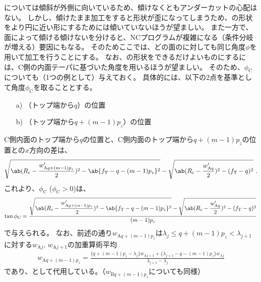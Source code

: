 \clearpage
\begin{\Columnname}{\CsideDimpleAngle}
\CfaceDimple については傾斜が外側に向いているため、傾けなくともアンダーカットの心配はない。
しかし、傾けたまま加工をすると形状が歪になってしまうため、\Dimple の形状をより円に近い形にするためには傾いていないほうが望ましい。
また一方で、面によって傾ける傾けないを分けると、NCプログラムが複雑になる（条件分岐が増える）要因にもなる。
そのためここでは、どの面の\Dimple に対しても同じ角度$\phi$を用いて加工を行うことにする。
\tcbline*
なお、\CfaceDimple の形状をできるだけよいものにするには、C側の内面テーパに基づいた角度を用いるほうが望ましい。
そのため、\CsideDimpleAngle$\phi_\mathrm C$についても（1つの例として）与えておく。
具体的には、以下の2点を基準として角度$\phi_\mathrm C$を取ることとする。
\begin{enumerate}
\item[a)] \CFaceDimpleFirstRow（トップ端から$q$）の位置
\item[b)] \CFaceDimpleLastRow（トップ端から$q+(m-1)p_z$）の位置
\end{enumerate}
C側内面のトップ端から$q$の位置と、C側内面のトップ端から$q+(m-1)p_z$の位置との$x$方向の差は、
\begin{align*}
  \sqrt{\ab(R_\mathrm c-\frac{w'_{\mathrm Aq+(m-1)p_z}}2)^2
        -\ab\{f_\mathrm T-q-(m-1)p_z\}^2}
  -\sqrt{\ab(R_\mathrm c-\frac{w'_{\mathrm Aq}}2)^2-(f_\mathrm T-q)^2}\ .
\end{align*}
これより、\CsideDimpleAngle$\phi_\mathrm C$ ($\phi_\mathrm C > 0$)は、
\begin{align*}
  \tan\phi_\mathrm C
  = \frac{\displaystyle
          \sqrt{\ab(R_\mathrm c-\frac{w'_{\mathrm Aq+(m-1)p_z}}2)^2
                -\ab\{f_\mathrm T-q-(m-1)p_z\}^2}
          -\sqrt{\ab(R_\mathrm c-\frac{w'_{\mathrm Aq}}2)^2-(f_\mathrm T-q)^2}}
         {(m-1)p_z}
\end{align*}
で与えられる。
なお、前述の通り$w_{\mathrm Aq+(m-1)p_z}$は$\lambda_j \leq q+(m-1)p_z < \lambda_{j+1}$に対する$w_{\mathrm Aj}$, $w_{\mathrm Aj+1}$の加重算術平均
\begin{align*}
  w_{\mathrm Aq+(m-1)p_z}
  = \frac{\{q+(m-1)p_z-\lambda_j\}w_{\mathrm Aj+1}+\{\lambda_{j+1}-q-(m-1)p_z\}w_{\mathrm Aj}}
         {\lambda_{j+1}-\lambda_j}
\end{align*}
であり、\InnerDiameter として代用している。（$w_{\mathrm Bq+(m-1)p_z}$についても同様）
\end{\Columnname}


